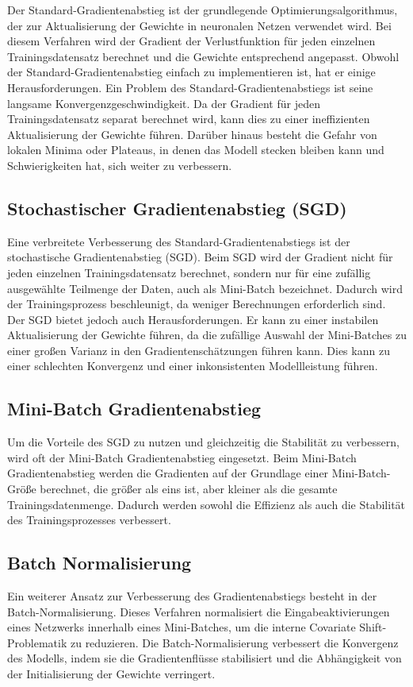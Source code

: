     Der Standard-Gradientenabstieg ist der grundlegende Optimierungsalgorithmus, der zur Aktualisierung der Gewichte in neuronalen Netzen verwendet wird. 
    Bei diesem Verfahren wird der Gradient der Verlustfunktion für jeden einzelnen Trainingsdatensatz berechnet und die Gewichte entsprechend angepasst. 
    Obwohl der Standard-Gradientenabstieg einfach zu implementieren ist, hat er einige Herausforderungen.
    Ein Problem des Standard-Gradientenabstiegs ist seine langsame Konvergenzgeschwindigkeit. 
    Da der Gradient für jeden Trainingsdatensatz separat berechnet wird, kann dies zu einer ineffizienten Aktualisierung der Gewichte führen. 
    Darüber hinaus besteht die Gefahr von lokalen Minima oder Plateaus, in denen das Modell stecken bleiben kann und Schwierigkeiten hat, sich weiter zu verbessern.

\subsection{Stochastischer Gradientenabstieg (SGD)}

    Eine verbreitete Verbesserung des Standard-Gradientenabstiegs ist der stochastische Gradientenabstieg (SGD). 
    Beim SGD wird der Gradient nicht für jeden einzelnen Trainingsdatensatz berechnet, sondern nur für eine zufällig ausgewählte Teilmenge der Daten, auch als Mini-Batch bezeichnet. 
    Dadurch wird der Trainingsprozess beschleunigt, da weniger Berechnungen erforderlich sind.
    Der SGD bietet jedoch auch Herausforderungen. 
    Er kann zu einer instabilen Aktualisierung der Gewichte führen, da die zufällige Auswahl der Mini-Batches zu einer großen Varianz in den Gradientenschätzungen führen kann. 
    Dies kann zu einer schlechten Konvergenz und einer inkonsistenten Modellleistung führen.

\subsection{Mini-Batch Gradientenabstieg}

    Um die Vorteile des SGD zu nutzen und gleichzeitig die Stabilität zu verbessern, wird oft der Mini-Batch Gradientenabstieg eingesetzt.
    Beim Mini-Batch Gradientenabstieg werden die Gradienten auf der Grundlage einer Mini-Batch-Größe berechnet, die größer als eins ist, aber kleiner als die gesamte Trainingsdatenmenge. 
    Dadurch werden sowohl die Effizienz als auch die Stabilität des Trainingsprozesses verbessert.

\subsection{Batch Normalisierung}

    Ein weiterer Ansatz zur Verbesserung des Gradientenabstiegs besteht in der Batch-Normalisierung. 
    Dieses Verfahren normalisiert die Eingabeaktivierungen eines Netzwerks innerhalb eines Mini-Batches, um die interne Covariate Shift-Problematik zu reduzieren. 
    Die Batch-Normalisierung verbessert die Konvergenz des Modells, indem sie die Gradientenflüsse stabilisiert und die Abhängigkeit von der Initialisierung der Gewichte verringert.
